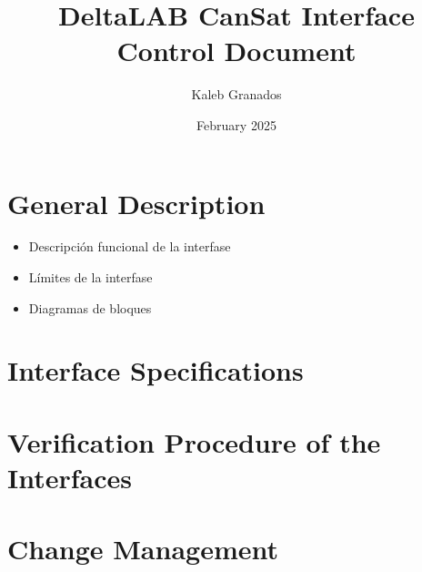 \documentclass{article}
\title{DeltaLAB CanSat Interface Control Document}
\author{Kaleb Granados}
\date{February 2025}
\begin{document}
\maketitle
\newpage

\section{General Description}

\begin{itemize}
    \item Descripción funcional de la interfase
    \item Límites de la interfase
    \item Diagramas de bloques
\end{itemize}



\section{Interface Specifications}

\section{Verification Procedure of the Interfaces}

\section{Change Management}
\end{document}
